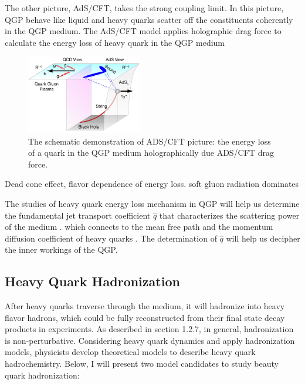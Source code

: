 The other picture, AdS/CFT, takes the strong coupling limit. In this picture, QGP behave like liquid and heavy quarks scatter off the constituents coherently in the QGP medium. The AdS/CFT model applies holographic drag force \cite{ADSCFTDrag} to calculate the energy loss of heavy quark \cite{HQHoloELoss} in the QGP medium

 \begin{figure}[hbtp]
\begin{center}
\includegraphics[width=0.45\textwidth]{Figures/Chapter1/ADSCFT.png}
\caption{The schematic demonstration of ADS/CFT picture: the energy loss of a quark in the QGP medium holographically due ADS/CFT drag force.}
\label{ADCCFT}
\end{center}
\end{figure}  

Dead cone effect, flavor dependence of energy loss. soft gluon radiation dominates


The studies of heavy quark energy loss mechanism in QGP will help us determine  the fundamental jet transport coefficient $\hat q$ that characterizes the scattering power of the medium \cite{HQReview}. which connects to the mean free path and the momentum diffusion coefficient of heavy quarks \cite{qhatStudy}. The determination of $\hat q$ will help us decipher the inner workings of the QGP.

\subsection{Heavy Quark Hadronization}

After heavy quarks traverse through the medium, it will hadronize into heavy flavor hadrons, which could be fully reconstructed from their final state decay products in experiments. As described in section 1.2.7, in general, hadronization is non-perturbative. Considering heavy quark dynamics and apply hadronization models, physicists develop theoretical models to describe heavy quark hadrochemistry. Below, I will present two model candidates to study beauty quark hadronization:


